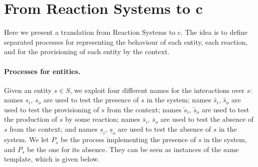 

\section{From Reaction Systems to c\CNA}
\label{sec:trans}
Here we present a translation from Reaction Systems to c\CNA.
The idea is to define separated processes for representing the behaviour of each entity, each reaction, 
and for the provisioning of each entity by the context.

\paragraph{Processes for entities.}
Given an entity $s \in S$, we exploit four different names for the interactions over $s$:
names $s_i$, $s_o$ are used to test the presence of $s$ in the system; names $\hat{s}_i$, $\hat{s}_o$ are used to test the provisioning of $s$ from the context;
names $\tilde{s}_i$, $\tilde{s}_o$  are used to test the production of $s$ by some reaction; names $\overline{s}_i$, $\overline{s}_o$ are used to test the absence of $s$ from the context; and names $\underline{s}_i$, $\underline{s}_o$ are used to test the absence of $s$ in the system.
We let $P_s$ be the process implementing the  presence of $s$ in the system, and $\overline{P_s}$ be the one for its absence.
They can be seen as instances of the same template, which is given below. 

